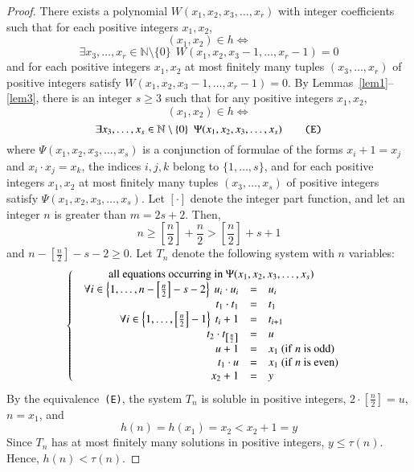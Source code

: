 \documentclass[conference]{IEEEtran}
\begin{document}
\begin{proof}
There exists a polynomial \mbox{$W(x_1,x_2,x_3,\ldots,x_r)$} with integer coefficients
such that for each positive integers \mbox{$x_1,x_2$},
\[
(x_1,x_2) \in h \Longleftrightarrow
\]
\[
\exists x_3,\ldots,x_r \in {\mathbb N} \setminus \{0\}~~ W(x_1,x_2,x_3-1,\ldots,x_r-1)=0
\]
and for each positive integers \mbox{$x_1,x_2$} at most finitely many tuples
\mbox{$(x_3,\ldots,x_r)$} of positive integers satisfy \mbox{$W(x_1,x_2,x_3-1,\ldots,x_r-1)=0$}.
By \mbox{Lemmas \ref{lem1}--\ref{lem3}}, there is an integer \mbox{$s \geqslant 3$} such that
for any positive integers \mbox{$x_1,x_2$},
\[
(x_1,x_2) \in h \Longleftrightarrow
\]
\begin{equation}
\exists x_3,\ldots,x_s \in {\mathbb N} \setminus \{0\}~~ \Psi(x_1,x_2,x_3,\ldots,x_s)\tag*{\texttt{(E)}}
\end{equation}
where \mbox{$\Psi(x_1,x_2,x_3,\ldots,x_s)$} is a conjunction of formulae of the forms
\mbox{$x_i+1=x_j$} and \mbox{$x_i \cdot x_j=x_k$}, the indices $i,j,k$ belong to
$\{1,\ldots,s\}$, and for each positive integers \mbox{$x_1,x_2$} at most finitely
many tuples \mbox{$(x_3,\ldots,x_s)$} of positive integers satisfy \mbox{$\Psi(x_1,x_2,x_3,\ldots,x_s)$}.
Let $[\cdot]$ denote the integer part function, and let an integer $n$ is greater than \mbox{$m=2s+2$}.
Then,
\[
n \geqslant \left[\frac{n}{2}\right]+\frac{n}{2}>\left[\frac{n}{2}\right]+s+1
\]
and \mbox{$n-\left[\frac{n}{2}\right]-s-2 \geqslant 0$}.
Let $T_n$ denote the following system with $n$ variables:
\[
\left\{
\begin{array}{c}
\textrm{all~equations~occurring~in~}\Psi(x_1,x_2,x_3,\ldots,x_s)\\
\begin{array}{rcl}
\forall i \in \left\{1,\ldots,n-\left[\frac{n}{2}\right]-s-2\right\} ~u_i \cdot u_i &=& u_i\\
t_1 \cdot t_1 &=& t_1\\
\forall i \in \left\{1,\ldots,\left[\frac{n}{2}\right]-1\right\} ~t_i+1 &=& t_{i+1}\\
t_2 \cdot t_{\left[\frac{n}{2}\right]} &=& u\\
u+1 &=&x_1 {\rm ~(if~}n{\rm ~is~odd)}\\
t_1 \cdot u &=& x_1 {\rm ~(if~}n{\rm ~is~even)}\\
x_2+1 &=& y
\end{array}
\end{array}
\right.
\]
By the equivalence~\texttt{(E)}, the system $T_n$ is soluble in positive integers,
\mbox{$2 \cdot \left[\frac{n}{2}\right]=u$}, \mbox{$n=x_1$}, and
\[
h(n)=h(x_1)=x_2<x_2+1=y
\]
Since $T_n$ has at most finitely many solutions in positive integers, \mbox{$y \leqslant \tau(n)$}.
Hence, \mbox{$h(n)<\tau(n)$}.
\end{proof}
\end{document}
